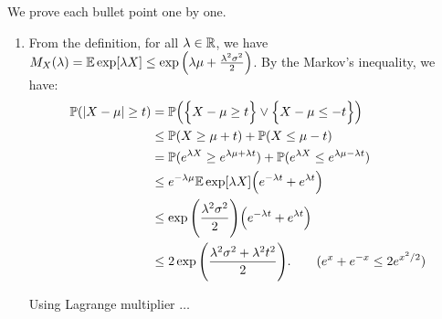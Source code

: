 \begin{proof*}
	We prove each bullet point one by one.
	\begin{enumerate}[label=(\roman*)]
		\item From the definition, for all $\lambda\in\mathbb{R}$, we have $M_X(\lambda) = \mathbb{E}\exp[\lambda X] \le \exp\Big( \lambda\mu+\frac{\lambda^2\sigma^2}{2} \Big)$. By the Markov's inequality, we have:
		\begin{align*}
			\mathbb{P}(|X-\mu| \ge t) &= \mathbb{P}\Big( \Big\{ X - \mu \ge t \Big\} \vee \Big\{ X - \mu \le -t \Big\} \Big) \\
			&\le \mathbb{P}(X \ge \mu + t) + \mathbb{P}(X\le \mu - t) \\
			&= \mathbb{P}(e^{\lambda X} \ge e^{\lambda\mu + \lambda t}) + \mathbb{P}(e^{\lambda X} \le e^{\lambda\mu - \lambda t}) \\
			&\le e^{-\lambda\mu}\mathbb{E}\exp[\lambda X]\Big( e^{-\lambda t} + e^{\lambda t} \Big) \\
			&\le \exp\Bigg( \frac{\lambda^2\sigma^2}{2} \Bigg)\Big( e^{-\lambda t} + e^{\lambda t} \Big) \\
			&\le 2\exp\Bigg( \frac{\lambda^2\sigma^2 + \lambda^2t^2}{2} \Bigg). \qquad (e^x + e^{-x} \le 2e^{x^2/2})
		\end{align*} 

		\noindent Using Lagrange multiplier $\dots$
	\end{enumerate} 
\end{proof*} 
